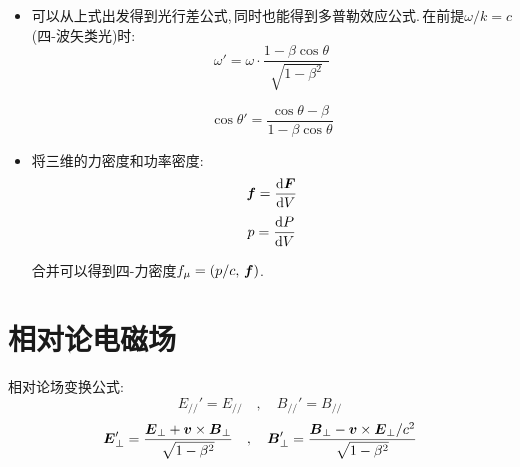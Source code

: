 \begin{itemize}
\item 可以从上式出发得到光行差公式,\,同时也能得到多普勒效应公式.\,在前提$\omega/k=c$(四-波矢类光)时:
\[\omega'=\omega\cdot \frac{1-\beta \cos\theta}{\sqrt{1-\beta^2}}\]

\[\cos \theta'=\frac{\cos \theta -\beta}{1-\beta \cos\theta}\]

\item 将三维的力密度和功率密度:
\[\boldsymbol{f}=\frac{\textrm{d} \boldsymbol{F}}{\textrm{d} V}\]
\[p=\frac{\textrm{d} P}{\textrm{d} V}\]

合并可以得到四-力密度$f_\mu=(p/c,\,\boldsymbol{f})$.

\end{itemize}

\section{相对论电磁场}

相对论场变换公式:
\[E_{//}'=E_{//}\quad ,\quad B_{//}'=B_{//}\]
\[\boldsymbol{E}_\perp'=\frac{\boldsymbol{E}_\perp+\boldsymbol{v}\times \boldsymbol{B}_\perp}{\sqrt{1-\beta^2}}\quad,\quad \boldsymbol{B}_\perp'=\frac{\boldsymbol{B}_\perp-\boldsymbol{v}\times \boldsymbol{E}_\perp/c^2}{\sqrt{1-\beta^2}}\]
